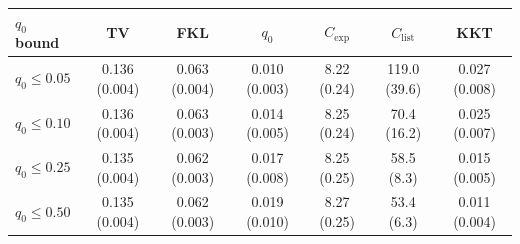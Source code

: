 \begin{tabular}{lcccccc}
\toprule
$q_0$ bound & TV & FKL & $q_0$ & $C_{\mathrm{exp}}$ & $C_{\mathrm{list}}$ & KKT \\
\midrule
$q_0\le0.05$ & 0.136 (0.004) & 0.063 (0.004) & 0.010 (0.003) & 8.22 (0.24) & 119.0 (39.6) & 0.027 (0.008) \\
$q_0\le0.10$ & 0.136 (0.004) & 0.063 (0.003) & 0.014 (0.005) & 8.25 (0.24) & 70.4 (16.2) & 0.025 (0.007) \\
$q_0\le0.25$ & 0.135 (0.004) & 0.062 (0.003) & 0.017 (0.008) & 8.25 (0.25) & 58.5 (8.3) & 0.015 (0.005) \\
$q_0\le0.50$ & 0.135 (0.004) & 0.062 (0.003) & 0.019 (0.010) & 8.27 (0.25) & 53.4 (6.3) & 0.011 (0.004) \\
\bottomrule
\end{tabular}
